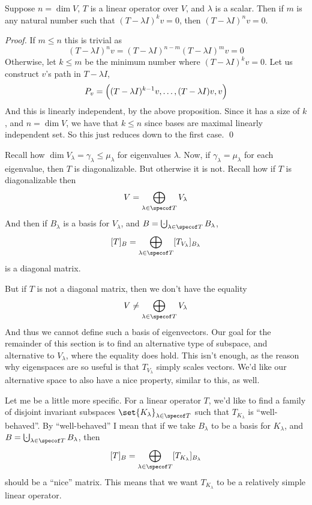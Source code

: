 \begin{prop*}[nWillZeroYou]

    Suppose $n=\dim V$, $T$ is a linear operator over $V$, and $\lambda$ is a scalar.
    Then if $m$ is any natural number such that $(T-\lambda I)^kv=0$, then $(T-\lambda I)^nv=0$.

\end{prop*}

\begin{proof}

    If $m\leq n$ this is trivial as
    \[ (T-\lambda I)^nv = (T-\lambda I)^{n-m}(T-\lambda I)^mv = 0 \]
    Otherwise, let $k\leq m$ be the minimum number where $(T-\lambda I)^kv=0$.
    Let us construct $v$'s path in $T-\lambda I$,
    \[ P_v = \Bigl((T-\lambda I)^{k-1}v,\dots,(T-\lambda I)v,v\Bigr) \]
    And this is linearly independent, by the above proposition.
    Since it has a size of $k$, and $n=\dim V$, we have that $k\leq n$ since bases are maximal linearly independent set.
    So this just reduces down to the first case.
    \qed

\end{proof}

Recall how $\dim V_\lambda=\gamma_\lambda\leq\mu_\lambda$ for eigenvalues $\lambda$.
Now, if $\gamma_\lambda=\mu_\lambda$ for each eigenvalue, then $T$ is diagonalizable.
But otherwise it is not.
Recall how if $T$ is diagonalizable then
\[ V = \bigoplus_{\lambda\in\specof T}V_\lambda \]
And then if $B_\lambda$ is a basis for $V_\lambda$, and $B=\bigdcup_{\lambda\in\specof T}B_\lambda$,
\[ [T]_B = \bigoplus_{\lambda\in\specof T}[T_{V_\lambda}]_{B_\lambda} \]
is a diagonal matrix.

But if $T$ is not a diagonal matrix, then we don't have the equality
\[ V \neq \bigoplus_{\lambda\in\specof T}V_\lambda \]
And thus we cannot define such a basis of eigenvectors.
Our goal for the remainder of this section is to find an alternative type of subspace, and alternative to $V_\lambda$, where the equality does hold.
This isn't enough, as the reason why eigenspaces are so useful is that $T_{V_\lambda}$ simply scales vectors.
We'd like our alternative space to also have a nice property, similar to this, as well.

Let me be a little more specific.
For a linear operator $T$, we'd like to find a family of disjoint invariant subspaces $\set{K_\lambda}_{\lambda\in\specof T}$ such that $T_{K_\lambda}$ is ``well-behaved''.
By ``well-behaved'' I mean that if we take $B_\lambda$ to be a basis for $K_\lambda$, and $B=\bigdcup_{\lambda\in\specof T}B_\lambda$, then
\[ [T]_B = \bigoplus_{\lambda\in\specof T}[T_{K_\lambda}]_{B_\lambda} \]
should be a ``nice'' matrix.
This means that we want $T_{K_\lambda}$ to be a relatively simple linear operator.


